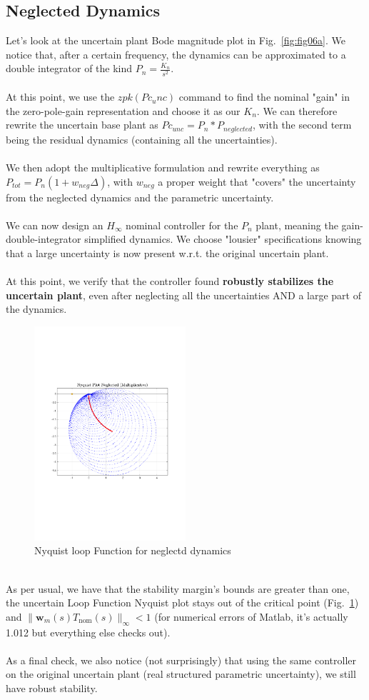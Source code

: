 \documentclass[a4paper, 12pt]{article}
\def\FigureEleven{\centering\includegraphics[width=0.5\textwidth]{Figures/fig11.pdf}}
\begin{document}
\subsection{Neglected Dynamics}
Let's look at the uncertain plant Bode magnitude plot in Fig.~\ref{fig:fig06a}. We notice that, after a certain frequency, the dynamics can be approximated to a double integrator of the kind $P_n = \frac{K_n}{s^2}$.\\
\\ At this point, we use the $zpk(Pc_unc)$ command to find the nominal "gain" in the zero-pole-gain representation and choose it as our $K_n$. We can therefore rewrite the uncertain base plant as $Pc_{unc} = P_n * P_{neglected}$, with the second term being the residual dynamics (containing all the uncertainties).
\\\\
We then adopt the multiplicative formulation and rewrite everything as $P_{tot} = P_n(1+w_{neg}\Delta)$, with $w_{neg}$ a proper weight that "covers" the uncertainty from the neglected dynamics and the parametric uncertainty.
\\\\
We can now design an $H_\infty$ nominal controller for the $P_n$ plant, meaning the gain-double-integrator simplified dynamics. We choose "lousier" specifications knowing that a large uncertainty is now present w.r.t. the original uncertain plant.
\\\\
At this point, we verify that the controller found \textbf{robustly stabilizes the uncertain plant}, even after neglecting all the uncertainties AND a large part of the dynamics.
\begin{figure}[h!]
    \FigureEleven
    \caption{Nyquist loop Function for neglectd dynamics}
    \label{fig:fig11}
\end{figure}
\\
As per usual, we have that the stability margin's bounds are greater than one, the uncertain Loop Function Nyquist plot stays out of the critical point (Fig.~\ref{fig:fig11}) and $\|\mathbf{w}_m(s) T_{\text{nom}}(s)\|_\infty < 1$ (for numerical errors of Matlab, it's actually 1.012 but everything else checks out).
\\\\
As a final check, we also notice (not surprisingly) that using the same controller on the original uncertain plant (real structured parametric uncertainty), we still have robust stability.
\end{document}
